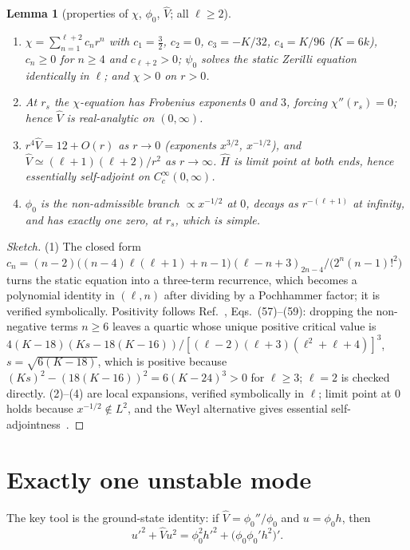 \documentclass[11pt]{article}
\newtheorem{lemma}{Lemma}
\theoremstyle{remark}
\newcommand{\Hhat}{\hat{H}}
\newcommand{\Vhat}{\hat{V}}
\begin{document}
\begin{lemma}[properties of $\chi$, $\phi_0$, $\Vhat$; all $\ell\ge2$]\label{lem:props}\leavevmode
\begin{enumerate}
\item $\chi=\sum_{n=1}^{\ell+2}c_n r^n$ with $c_1=\tfrac32$, $c_2=0$, $c_3=-K/32$, $c_4=K/96$ ($K=6k$), $c_n\ge0$ for
$n\ge4$ and $c_{\ell+2}>0$; $\psi_0$ solves the static Zerilli equation identically in $\ell$; and $\chi>0$ on $r>0$.
\item At $r_s$ the $\chi$-equation has Frobenius exponents $0$ and $3$, forcing $\chi''(r_s)=0$; hence $\Vhat$ is
real-analytic on $(0,\infty)$.
\item $r^4\Vhat=12+O(r)$ as $r\to0$ (exponents $x^{3/2}$, $x^{-1/2}$), and $\Vhat\simeq(\ell+1)(\ell+2)/r^2$ as
$r\to\infty$. $\Hhat$ is limit point at both ends, hence essentially self-adjoint on $C_c^\infty(0,\infty)$.
\item $\phi_0$ is the non-admissible branch $\propto x^{-1/2}$ at $0$, decays as $r^{-(\ell+1)}$ at infinity, and has
exactly one zero, at $r_s$, which is simple.
\end{enumerate}
\end{lemma}
\begin{proof}[Sketch]
(1) The closed form $c_n=(n-2)\bigl((n-4)\ell(\ell+1)+n-1\bigr)(\ell-n+3)_{2n-4}/\bigl(2^n(n-1)!^2\bigr)$ turns the static
equation into a three-term recurrence, which becomes a polynomial identity in $(\ell,n)$ after dividing by a Pochhammer
factor; it is verified symbolically. Positivity follows Ref.~\cite{DG2009}, Eqs.~(57)--(59): dropping the non-negative
terms $n\ge6$ leaves a quartic whose unique positive critical value is
$4(K-18)(Ks-18(K-16))/[(\ell-2)(\ell+3)(\ell^2+\ell+4)]^3$, $s=\sqrt{6(K-18)}$, which is positive because
$(Ks)^2-(18(K-16))^2=6(K-24)^3>0$ for $\ell\ge3$; $\ell=2$ is checked directly. (2)--(4) are local expansions, verified
symbolically in $\ell$; limit point at $0$ holds because $x^{-1/2}\notin L^2$, and the Weyl alternative gives essential
self-adjointness~\cite{ReedSimon2,Weidmann1987}.
\end{proof}

\section{Exactly one unstable mode}\label{sec:one}

The key tool is the ground-state identity: if $\Vhat=\phi_0''/\phi_0$ and $u=\phi_0 h$, then
\begin{equation}\label{eq:gs}
u'^2+\Vhat u^2=\phi_0^2h'^2+\bigl(\phi_0\phi_0'h^2\bigr)'.
\end{equation}
\end{document}
